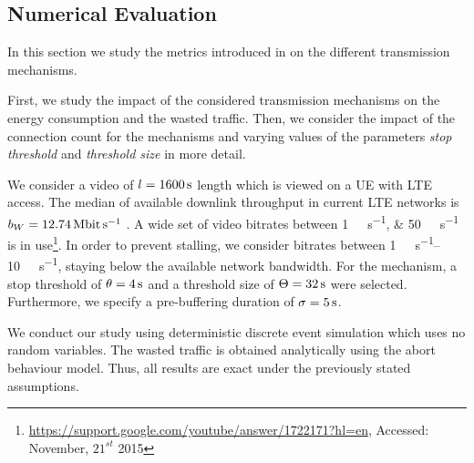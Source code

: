 \subsection{Numerical Evaluation}\label{sec:application:lte_video:numerical_evaluation}

In this section we study the metrics introduced in  on the different transmission mechanisms.

First, we study the impact of the considered transmission mechanisms on the energy consumption and the wasted traffic. 
Then, we consider the impact of the connection count for the \streaming mechanisms and varying values of the parameters \emph{stop threshold} \bufferlower and \emph{threshold size} \buffersize in more detail.

We consider a video of \(l=\SI{1600}{\second}\) length which is viewed on a \gls{UE} with \gls{LTE} access.
The median of available downlink throughput in current \gls{LTE} networks is \(\bandwidth = \SI{12.74}{\mega\bit\per\second}\) \cite{Huang2012}.
A wide set of video bitrates between \SIlist{1;50}{\mega\bit\per\second} is in use\footnote{\url{https://support.google.com/youtube/answer/1722171?hl=en}, Accessed: November, \(21^{st}\) 2015}.
In order to prevent stalling, we consider bitrates between \SIrange{1}{10}{\mega\bit\per\second}, staying below the available network bandwidth.
For the \streaming mechanism, a stop threshold of \(\theta = \SI{4}{\second}\) and a threshold size of \(\Theta = \SI{32}{\second}\) were selected.
Furthermore, we specify a pre-buffering duration of \(\sigma = \SI{5}{\second}\).

We conduct our study using deterministic discrete event simulation which uses no random variables.
The wasted traffic is obtained analytically using the abort behaviour model.
Thus, all results are exact under the previously stated assumptions.

